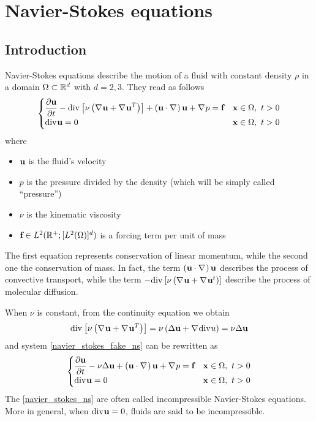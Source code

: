 \newpage 
\section{Navier-Stokes equations}
\subsection{Introduction}
Navier-Stokes equations describe the motion of a fluid with constant density \(\rho\) in a domain \(\Omega \subset \mathbb{R}^d\) with \(d = 2,3\). They read as follows
\begin{equation}
    \begin{cases}
        \displaystyle \partialderivative{\uvec}{t} - \div \left[ \nu \left( \grad \uvec + \grad \uvec^T \right) \right] + \left( \uvec \cdot \grad \right) \uvec + \grad p = \vect{f} & \xvec \in \Omega, \ t > 0 \\
        \div \uvec = 0 & \xvec \in \Omega, \ t > 0
    \end{cases}
    \label{navier_stokes_fake_ns}
\end{equation}
where 
\begin{itemize}
    \item \(\textbf{u}\) is the fluid's velocity
    \item \(p\) is the pressure divided by the density (which will be simply called ``pressure'')
    \item \(\nu\) is the kinematic viscosity 
    \item \(\textbf{f} \in L^2(\mathbb{R}^+; [L^2(\Omega)]^d)\) is a forcing term per unit of mass
\end{itemize}
The first equation represents conservation of linear momentum, while the second one the conservation of mass. In fact, the term \(\left( \textbf{u} \cdot \nabla\mspace{1mu} \right)\textbf{u}\) describes the process of convective transport, while the term \(-\text{div}\mspace{1mu} \left[ \nu \left( \nabla\mspace{1mu} \textbf{u} + \nabla\mspace{1mu} \textbf{u}^t \right) \right]\) describe the process of molecular diffusion.

When \(\nu\) is constant, from the continuity equation we obtain 
\[
    \text{div}\mspace{1mu} \left[ \nu \left( \nabla\mspace{1mu} \textbf{u} + \nabla\mspace{1mu} \textbf{u}^T \right) \right] = \nu \left( \Delta \textbf{u} +\nabla\mspace{1mu} \text{div}\mspace{1mu} u \right) = \nu\Delta \textbf{u}
\]
and system \eqref{navier_stokes_fake_ns} can be rewritten as 
\begin{equation}
    \begin{cases}
        \displaystyle \partialderivative{\uvec}{t} - \nu \Delta \uvec + \left( \uvec \cdot \grad \right) \uvec + \grad p = \vect{f} & \xvec \in \Omega, \ t > 0 \\
        \div\uvec = 0 & \xvec \in \Omega, \ t > 0
    \end{cases}
    \label{navier_stokes_ns}
\end{equation}
The \eqref{navier_stokes_ns} are often called incompressible Navier-Stokes equations. More in general, when \(\text{div}\mspace{1mu}\textbf{u} = 0\), fluids are said to be incompressible. 

